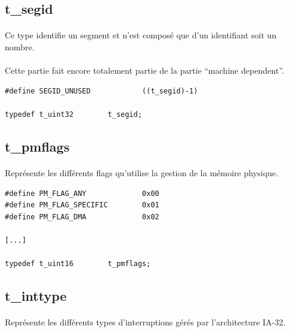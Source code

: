 \documentclass[10pt,a4wide]{article}
\begin{document}
\subsection{t\_segid}

\paragraph{}

Ce type identifie un segment et n'est compos\'e que d'un identifiant soit
un nombre.

\paragraph{}

Cette partie fait encore totalement partie de la partie ``machine dependent''.

\begin{verbatim}
#define SEGID_UNUSED            ((t_segid)-1)

typedef t_uint32        t_segid;
\end{verbatim}

\subsection{t\_pmflags}

\paragraph{}

Repr\'esente les diff\'erents flags qu'utilise la gestion de la m\'emoire
physique.

\begin{verbatim}
#define PM_FLAG_ANY             0x00
#define PM_FLAG_SPECIFIC        0x01
#define PM_FLAG_DMA             0x02

[...]

typedef t_uint16        t_pmflags;
\end{verbatim}

\subsection{t\_inttype}

\paragraph{}

Repr\'esente les diff\'erents types d'interruptions g\'er\'es par
l'architecture IA-32.
\end{document}
